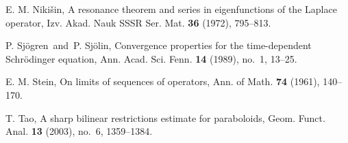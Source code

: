 \documentclass[biblatex]{pzorin-note}
\begin{document}
\begin{thebibliography}{15}



 E. M. Niki\v sin, A resonance theorem and series in eigenfunctions of the Laplace operator, Izv. Akad. Nauk SSSR Ser. Mat. {\bf 36} (1972), 795--813.



 P. Sj\"ogren\ and\ P. Sj\"olin, Convergence properties for the time-dependent Schr\"odinger equation, Ann. Acad. Sci. Fenn. {\bf 14} (1989), no.~1, 13--25.


 E. M. Stein, On limits of sequences of operators, Ann. of Math. {\bf 74} (1961), 140--170.





 T. Tao, A sharp bilinear restrictions estimate for paraboloids, Geom. Funct. Anal. {\bf 13} (2003), no.~6, 1359--1384.







\end{thebibliography}
\end{document}
